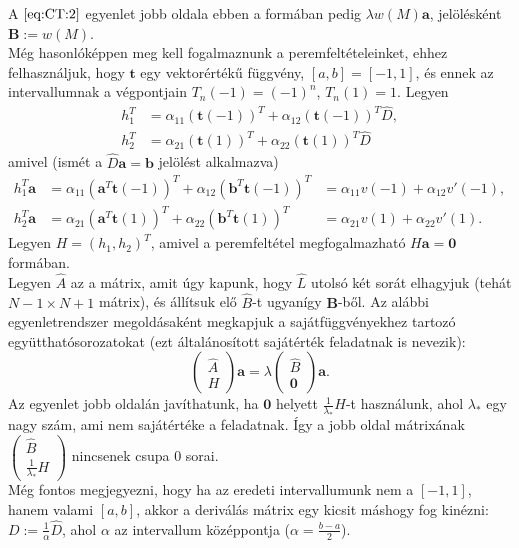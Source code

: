 \documentclass[oneside, titlepage, 12pt, a4paper]{report}
\begin{document}
A $\eqref{eq:CT:2}$ egyenlet jobb oldala ebben a formában pedig $\lambda w(M) \mathbf{a}$, jelölésként $\textbf{B} := w(M)$. \\
Még hasonlóképpen meg kell fogalmaznunk a peremfeltételeinket, ehhez felhasználjuk, hogy $\mathbf{t}$ egy vektorértékű függvény, $[a, b] = [-1, 1]$, és ennek az intervallumnak a végpontjain $T_n(-1) = (-1)^n$, $T_n(1) = 1$. Legyen
\begin{align*}
h_1^T &= \alpha_{11} (\mathbf{t}(-1))^T + \alpha_{12} (\mathbf{t}(-1))^T \hat{D}, \\
h_2^T &= \alpha_{21} (\mathbf{t}(1))^T + \alpha_{22} (\mathbf{t}(1))^T \hat{D}
\end{align*}
amivel (ismét a $\hat{D} \mathbf{a} = \mathbf{b}$ jelölést alkalmazva)
\begin{align*}
h_1^T \mathbf{a} &= \alpha_{11} (\mathbf{a}^T \mathbf{t}(-1))^T + \alpha_{12} (\mathbf{b}^T \mathbf{t}(-1))^T &= \alpha_{11} v(-1) + \alpha_{12} v'(-1), \\
h_2^T \mathbf{a} &= \alpha_{21} (\mathbf{a}^T \mathbf{t}(1))^T + \alpha_{22} (\mathbf{b}^T \mathbf{t}(1))^T &= \alpha_{21} v(1) + \alpha_{22} v'(1).
\end{align*}
Legyen $H = (h_1, h_2)^T$, amivel a peremfeltétel megfogalmazható $H \textbf{a} = \textbf{0}$ formában. \\
Legyen $\hat{A}$ az a mátrix, amit úgy kapunk, hogy $\hat{L}$ utolsó két sorát elhagyjuk (tehát $N-1 \times N+1$ mátrix), és állítsuk elő $\hat{B}$-t ugyanígy $\textbf{B}$-ből. Az alábbi egyenletrendszer megoldásaként megkapjuk a sajátfüggvényekhez tartozó együtthatósorozatokat (ezt általánosított sajátérték feladatnak is nevezik):
\begin{equation*}
\begin{pmatrix} \hat{A} \\ H \end{pmatrix} \mathbf{a} = \lambda \begin{pmatrix} \hat{B} \\ \mathbf{0} \end{pmatrix} \mathbf{a}.
\end{equation*}
Az egyenlet jobb oldalán javíthatunk, ha $\mathbf{0}$ helyett $\frac{1}{\lambda_*} H$-t használunk, ahol $\lambda_*$ egy nagy szám, ami nem sajátértéke a feladatnak. Így a jobb oldal mátrixának
$\begin{pmatrix} \hat{B} \\ \frac{1}{\lambda_*} H \end{pmatrix}$
nincsenek csupa $0$ sorai. \\
Még fontos megjegyezni, hogy ha az eredeti intervallumunk nem a $[-1, 1]$, hanem valami $[a, b]$, akkor a deriválás mátrix egy kicsit máshogy fog kinézni: $D := \frac{1}{\alpha} \hat{D}$, ahol $\alpha$ az intervallum középpontja ($\alpha = \frac{b - a}{2}$).
\end{document}
